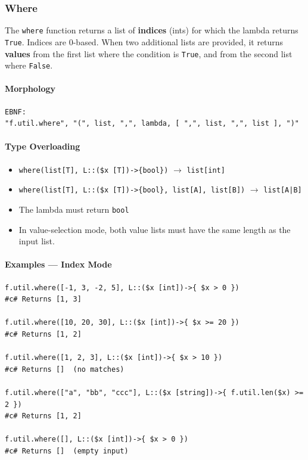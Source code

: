 \subsubsection{Where}
The \texttt{where} function returns a list of \textbf{indices} (ints) for which the lambda returns \texttt{True}. Indices are 0-based. When two additional lists are provided, it returns \textbf{values} from the first list where the condition is \texttt{True}, and from the second list where \texttt{False}.

\paragraph{Morphology}
\begin{verbatim}
EBNF:
"f.util.where", "(", list, ",", lambda, [ ",", list, ",", list ], ")"
\end{verbatim}

\paragraph{Type Overloading}
\begin{itemize}
\item \texttt{where(list[T], L::(\$x [T])->\{bool\})} $\rightarrow$ \texttt{list[int]}
\item \texttt{where(list[T], L::(\$x [T])->\{bool\}, list[A], list[B])} $\rightarrow$ \texttt{list[A|B]}
\item The lambda must return \texttt{bool}
\item In value-selection mode, both value lists must have the same length as the input list.
\end{itemize}

\paragraph{Examples — Index Mode}
\begin{verbatim}
f.util.where([-1, 3, -2, 5], L::($x [int])->{ $x > 0 })
#c# Returns [1, 3]

f.util.where([10, 20, 30], L::($x [int])->{ $x >= 20 })
#c# Returns [1, 2]

f.util.where([1, 2, 3], L::($x [int])->{ $x > 10 })
#c# Returns []  (no matches)

f.util.where(["a", "bb", "ccc"], L::($x [string])->{ f.util.len($x) >= 2 })
#c# Returns [1, 2]

f.util.where([], L::($x [int])->{ $x > 0 })
#c# Returns []  (empty input)
\end{verbatim}

